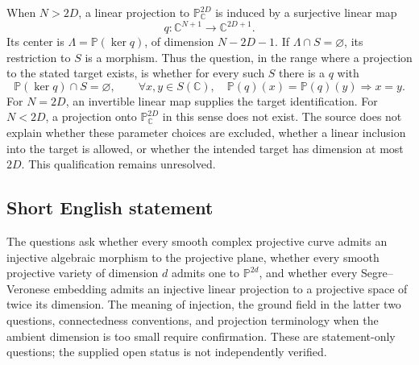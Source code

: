 \documentclass[11pt]{article}
\newcommand{\C}{\mathbb{C}}
\newcommand{\PP}{\mathbb{P}}
\begin{document}
When \(N>2D\), a linear projection to \(\PP^{2D}_{\C}\) is induced by a surjective linear map
\[
q:\C^{N+1}\longrightarrow\C^{2D+1}.
\]
Its center is \(\Lambda=\PP(\ker q)\), of dimension \(N-2D-1\). If \(\Lambda\cap S=\varnothing\), its restriction to \(S\) is a morphism. Thus the question, in the range where a projection to the stated target exists, is whether for every such \(S\) there is a \(q\) with
\[
\PP(\ker q)\cap S=\varnothing,
\qquad
\forall x,y\in S(\C),\quad \PP(q)(x)=\PP(q)(y)\Longrightarrow x=y.
\]
For \(N=2D\), an invertible linear map supplies the target identification. For \(N<2D\), a projection onto \(\PP^{2D}_{\C}\) in this sense does not exist. The source does not explain whether these parameter choices are excluded, whether a linear inclusion into the target is allowed, or whether the intended target has dimension at most \(2D\). This qualification remains unresolved.
\subsection{Short English statement}
The questions ask whether every smooth complex projective curve admits an injective algebraic morphism to the projective plane, whether every smooth projective variety of dimension \(d\) admits one to \(\PP^{2d}\), and whether every Segre--Veronese embedding admits an injective linear projection to a projective space of twice its dimension. The meaning of injection, the ground field in the latter two questions, connectedness conventions, and projection terminology when the ambient dimension is too small require confirmation. These are statement-only questions; the supplied open status is not independently verified.
\end{document}
